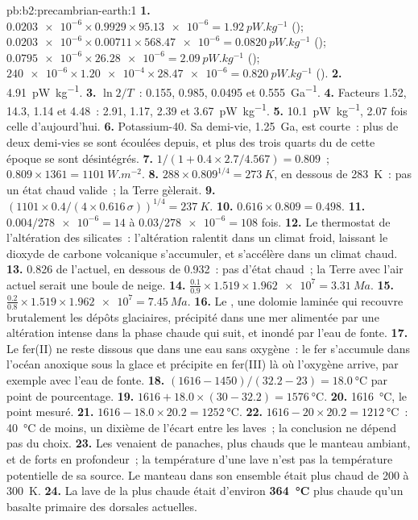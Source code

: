 \begin{solution}{pb:b2:precambrian-earth:1}
\textbf{1.} $\num{0.0203e-6}\times0.9929\times\num{95.13e-6} = \qty{1.92}{pW.kg^{-1}}$
(); $\num{0.0203e-6}\times0.00711\times\num{568.47e-6} = \qty{0.0820}{pW.kg^{-1}}$
(); $\num{0.0795e-6}\times\num{26.28e-6} = \qty{2.09}{pW.kg^{-1}}$ ();
$\num{240e-6}\times\num{1.20e-4}\times\num{28.47e-6} = \qty{0.820}{pW.kg^{-1}}$ ().
\textbf{2.} \qty{4.91}{pW.kg^{-1}}.
\textbf{3.} $\ln2/T$~: 0.155, 0.985, 0.0495 et \qty{0.555}{Ga^{-1}}.
\textbf{4.} Facteurs 1.52, 14.3, 1.14 et 4.48~: 2.91, 1.17, 2.39 et \qty{3.67}{pW.kg^{-1}}.
\textbf{5.} \qty{10.1}{pW.kg^{-1}}, 2.07 fois celle d'aujourd'hui.
\textbf{6.} Potassium-40. Sa demi-vie, \qty{1.25}{Ga}, est courte~: plus de deux demi-vies
se sont écoulées depuis, et plus des trois quarts du  de cette époque se sont désintégrés.
\textbf{7.} $1/(1 + 0.4\times2.7/4.567) = 0.809$~; $0.809\times1361 = \qty{1101}{W.m^{-2}}$.
\textbf{8.} $288\times0.809^{1/4} = \qty{273}{K}$, en dessous de \qty{283}{K}~: pas un état chaud valide~;
la Terre gèlerait.
\textbf{9.} $(1101\times0.4/(4\times0.616\,\sigma))^{1/4} = \qty{237}{K}$.
\textbf{10.} $0.616\times0.809 = 0.498$.
\textbf{11.} $0.004/\num{278e-6} = 14$ à $0.03/\num{278e-6} = 108$ fois.
\textbf{12.} Le thermostat de l'altération des silicates~: l'altération ralentit dans un climat froid, laissant
le dioxyde de carbone volcanique s'accumuler, et s'accélère dans un climat chaud.
\textbf{13.} 0.826 de l'actuel, en dessous de 0.932~: pas d'état chaud~; la Terre avec l'air actuel serait une
boule de neige.
\textbf{14.} $\frac{0.1}{0.9}\times1.519\times\num{1.962e7} = \qty{3.31}{Ma}$.
\textbf{15.} $\frac{0.2}{0.8}\times1.519\times\num{1.962e7} = \qty{7.45}{Ma}$.
\textbf{16.} Le , une dolomie laminée qui recouvre brutalement les dépôts glaciaires,
précipité dans une mer alimentée par une altération intense dans la phase chaude qui suit, et inondé par
l'eau de fonte.
\textbf{17.} Le fer(II) ne reste dissous que dans une eau sans oxygène~: le fer s'accumule dans
l'océan anoxique sous la glace et précipite en fer(III) là où l'oxygène arrive, par exemple avec
l'eau de fonte.
\textbf{18.} $(1616 - 1450)/(32.2 - 23) = \qty{18.0}{\celsius}$ par point de pourcentage.
\textbf{19.} $1616 + 18.0\times(30 - 32.2) = \qty{1576}{\celsius}$.
\textbf{20.} \qty{1616}{\celsius}, le point mesuré.
\textbf{21.} $1616 - 18.0\times20.2 = \qty{1252}{\celsius}$.
\textbf{22.} $1616 - 20\times20.2 = \qty{1212}{\celsius}$~: \qty{40}{\celsius} de moins, un dixième de
l'écart entre les laves~; la conclusion ne dépend pas du choix.
\textbf{23.} Les  venaient de panaches, plus chauds que le manteau ambiant, et de forts  en profondeur~; la température d'une lave n'est pas la température potentielle de sa source. Le
manteau dans son ensemble était plus chaud de 200 à \qty{300}{K}.
\textbf{24.} La lave de  la plus chaude était d'environ \textbf{\qty{364}{\celsius}} plus chaude qu'un
basalte primaire des dorsales actuelles.
\end{solution}
